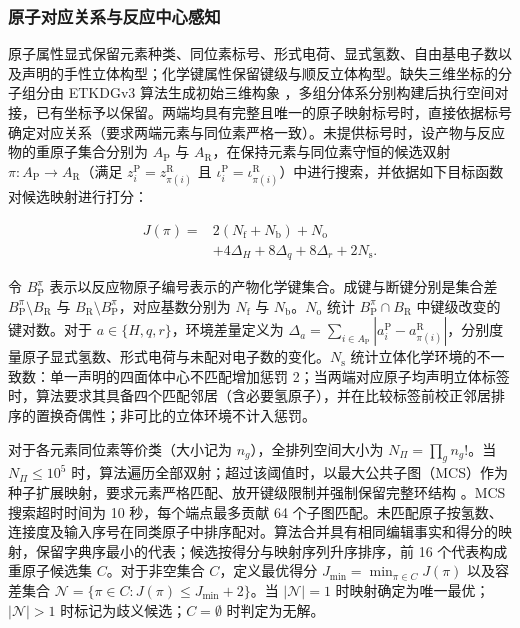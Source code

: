 \subsubsection{原子对应关系与反应中心感知}
原子属性显式保留元素种类、同位素标号、形式电荷、显式氢数、自由基电子数以及声明的手性立体构型；化学键属性保留键级与顺反立体构型。缺失三维坐标的分子组分由 ETKDGv3 算法生成初始三维构象 \citep{ref12,ref13}，多组分体系分别构建后执行空间对接，已有坐标予以保留。两端均具有完整且唯一的原子映射标号时，直接依据标号确定对应关系（要求两端元素与同位素严格一致）。未提供标号时，设产物与反应物的重原子集合分别为 $A_{\mathrm{P}}$ 与 $A_{\mathrm{R}}$，在保持元素与同位素守恒的候选双射 $\pi:A_{\mathrm{P}}\to A_{\mathrm{R}}$（满足 $z_i^{\mathrm{P}}=z_{\pi(i)}^{\mathrm{R}}$ 且 $\iota_i^{\mathrm{P}}=\iota_{\pi(i)}^{\mathrm{R}}$）中进行搜索，并依据如下目标函数对候选映射进行打分：

\begin{equation}\label{eq:methods-01}
\begin{aligned}
J(\pi)={}&2(N_{\mathrm{f}}+N_{\mathrm{b}})+N_{\mathrm{o}}\\
&+4\Delta_H+8\Delta_q+8\Delta_r+2N_{\mathrm{s}}.
\end{aligned}
\end{equation}

令 $B_{\mathrm{P}}^\pi$ 表示以反应物原子编号表示的产物化学键集合。成键与断键分别是集合差 $B_{\mathrm{P}}^\pi\setminus B_{\mathrm{R}}$ 与 $B_{\mathrm{R}}\setminus B_{\mathrm{P}}^\pi$，对应基数分别为 $N_{\mathrm{f}}$ 与 $N_{\mathrm{b}}$。$N_{\mathrm{o}}$ 统计 $B_{\mathrm{P}}^\pi\cap B_{\mathrm{R}}$ 中键级改变的键对数。对于 $a\in\{H,q,r\}$，环境差量定义为 $\Delta_a=\sum_{i\in A_{\mathrm{P}}}|a_i^{\mathrm{P}}-a_{\pi(i)}^{\mathrm{R}}|$，分别度量原子显式氢数、形式电荷与未配对电子数的变化。$N_{\mathrm{s}}$ 统计立体化学环境的不一致数：单一声明的四面体中心不匹配增加惩罚 2；当两端对应原子均声明立体标签时，算法要求其具备四个匹配邻居（含必要氢原子），并在比较标签前校正邻居排序的置换奇偶性；非可比的立体环境不计入惩罚。

对于各元素同位素等价类（大小记为 $n_g$），全排列空间大小为 $N_\Pi=\prod_g n_g!$。当 $N_\Pi\le 10^5$ 时，算法遍历全部双射；超过该阈值时，以最大公共子图（MCS）作为种子扩展映射，要求元素严格匹配、放开键级限制并强制保留完整环结构 \citep{ref13}。MCS 搜索超时时间为 10 秒，每个端点最多贡献 64 个子图匹配。未匹配原子按氢数、连接度及输入序号在同类原子中排序配对。算法合并具有相同编辑事实和得分的映射，保留字典序最小的代表；候选按得分与映射序列升序排序，前 16 个代表构成重原子候选集 $C$。对于非空集合 $C$，定义最优得分 $J_{\min}=\min_{\pi\in C}J(\pi)$ 以及容差集合 $\mathcal{N}=\{\pi\in C:J(\pi)\le J_{\min}+2\}$。当 $|\mathcal{N}|=1$ 时映射确定为唯一最优；$|\mathcal{N}|>1$ 时标记为歧义候选；$C=\emptyset$ 时判定为无解。

